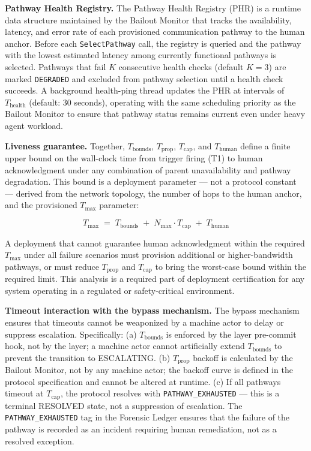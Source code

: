 \bigskip
\noindent\textbf{Pathway Health Registry.} The Pathway Health Registry (PHR) is a runtime data structure maintained by the Bailout Monitor that tracks the availability, latency, and error rate of each provisioned communication pathway to the human anchor. Before each \texttt{SelectPathway} call, the registry is queried and the pathway with the lowest estimated latency among currently functional pathways is selected. Pathways that fail $K$ consecutive health checks (default $K = 3$) are marked \texttt{DEGRADED} and excluded from pathway selection until a health check succeeds. A background health-ping thread updates the PHR at intervals of $T_{\text{health}}$ (default: 30 seconds), operating with the same scheduling priority as the Bailout Monitor to ensure that pathway status remains current even under heavy agent workload.

\bigskip
\noindent\textbf{Liveness guarantee.} Together, $T_{\text{bounds}}$, $T_{\text{prop}}$, $T_{\text{cap}}$, and $T_{\text{human}}$ define a finite upper bound on the wall-clock time from trigger firing (T1) to human acknowledgment under any combination of parent unavailability and pathway degradation. This bound is a deployment parameter — not a protocol constant — derived from the network topology, the number of hops to the human anchor, and the provisioned $T_{\max}$ parameter:

\begin{equation}
T_{\max} \;=\; T_{\text{bounds}} \;+\; N_{\max} \cdot T_{\text{cap}} \;+\; T_{\text{human}} \tag{T-max}
\end{equation}

A deployment that cannot guarantee human acknowledgment within the required $T_{\max}$ under all failure scenarios must provision additional or higher-bandwidth pathways, or must reduce $T_{\text{prop}}$ and $T_{\text{cap}}$ to bring the worst-case bound within the required limit. This analysis is a required part of deployment certification for any \bxthree{} system operating in a regulated or safety-critical environment.

\bigskip
\noindent\textbf{Timeout interaction with the bypass mechanism.} The bypass mechanism ensures that timeouts cannot be weaponized by a machine actor to delay or suppress escalation. Specifically: (a) $T_{\text{bounds}}$ is enforced by the \fact{} layer pre-commit hook, not by the \bounds{} layer; a machine actor cannot artificially extend $T_{\text{bounds}}$ to prevent the transition to ESCALATING. (b) $T_{\text{prop}}$ backoff is calculated by the Bailout Monitor, not by any machine actor; the backoff curve is defined in the protocol specification and cannot be altered at runtime. (c) If all pathways timeout at $T_{\text{cap}}$, the protocol resolves with \texttt{PATHWAY\_EXHAUSTED} — this is a terminal RESOLVED state, not a suppression of escalation. The \texttt{PATHWAY\_EXHAUSTED} tag in the Forensic Ledger ensures that the failure of the pathway is recorded as an incident requiring human remediation, not as a resolved exception.